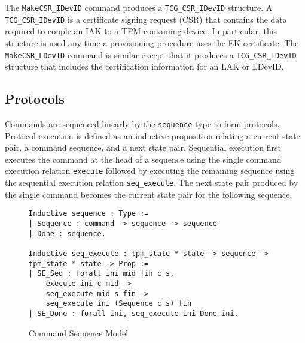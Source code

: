 \documentclass[runningheads]{llncs}
\begin{document}
The \verb|MakeCSR_IDevID| command produces a \verb|TCG_CSR_IDevID|
structure.  A \verb|TCG_CSR_IDevID| is a certificate signing request
(CSR) that contains the data required to couple an IAK to a
TPM-containing device.  In particular, this structure is used any time
a provisioning procedure uses the EK certificate.  The
\verb|MakeCSR_LDevID| command is similar except that it produces a
\verb|TCG_CSR_LDevID| structure that includes the certification
information for an LAK or LDevID.


\subsection{Protocols}

Commands are sequenced linearly by the \verb|sequence| type to form
protocols. Protocol execution is defined as an inductive proposition
relating a current state pair, a command sequence, and a next state
pair. Sequential execution first executes the command at the head of a
sequence using the single command execution relation \verb|execute|
followed by executing the remaining sequence using the sequential
execution relation \verb|seq_execute|. The next state pair produced by
the single command becomes the current state pair for the following
sequence.

\begin{figure}[hbtp]
\begin{lstlisting}[language=Coq]
Inductive sequence : Type :=
| Sequence : command -> sequence -> sequence
| Done : sequence.

Inductive seq_execute : tpm_state * state -> sequence -> tpm_state * state -> Prop :=
| SE_Seq : forall ini mid fin c s,
    execute ini c mid ->
    seq_execute mid s fin ->
    seq_execute ini (Sequence c s) fin
| SE_Done : forall ini, seq_execute ini Done ini.
\end{lstlisting}
\caption{Command Sequence Model}
\label{fig:command-sequence-model}
\end{figure}
\end{document}
